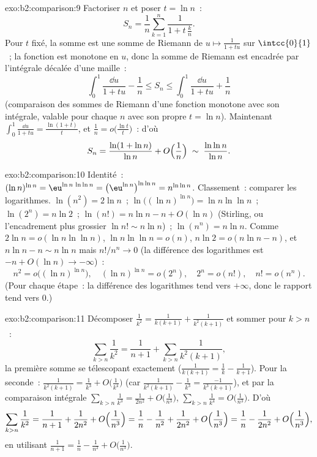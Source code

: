\begin{solution}{exo:b2:comparison:9}
Factoriser $n$ et poser $t = \ln n$~:
\[
S_n = \frac1n \sum_{k=1}^{n} \frac{1}{1 + t\,\frac kn} .
\]
Pour $t$ fixé, la somme est une somme de Riemann de $u \mapsto \frac{1}{1 +
tu}$ sur $\intcc{0}{1}$~; la fonction est monotone en $u$, donc la
somme de Riemann est encadrée par l'intégrale décalée d'une maille~:
\[
\int_0^1 \frac{\dd u}{1 + tu} - \frac1n
\leq S_n \leq \int_0^1 \frac{\dd u}{1 + tu} + \frac1n
\]
(comparaison des sommes de Riemann d'une fonction monotone avec son
intégrale, valable pour chaque $n$ avec son propre $t = \ln n$).
Maintenant $\int_0^1 \frac{\dd u}{1 + tu} = \frac{\ln(1 + t)}{t}$, et
$\frac1n = o\bigl(\frac{\ln t}{t}\bigr)$~: d'où
\[
S_n = \frac{\ln(1 + \ln n)}{\ln n} + O\Bigl(\frac 1n\Bigr)
\;\sim\; \frac{\ln\ln n}{\ln n} .
\]
\end{solution}

\begin{solution}{exo:b2:comparison:10}
Identité~: $(\ln n)^{\ln n} = \eu^{\ln n\,\ln\ln n} =
\bigl(\eu^{\ln n}\bigr)^{\ln\ln n} = n^{\ln\ln n}$. Classement~:
comparer les logarithmes. $\ln(n^2) = 2\ln n$~; $\ln\bigl((\ln
n)^{\ln n}\bigr) = \ln n\ln\ln n$~; $\ln(2^n) = n\ln2$~;
$\ln(n!) = n\ln n - n + O(\ln n)$ (Stirling, ou l'encadrement plus
grossier $\ln n! \sim n\ln n$)~; $\ln(n^n) = n\ln n$. Comme
$2\ln n = o(\ln n\ln\ln n)$, $\ln n\ln\ln n = o(n)$, $n\ln 2 =
o(n\ln n - n)$, et $n \ln n - n \sim n\ln n$ mais $n! / n^n \to
0$ (la différence des logarithmes est $-n + O(\ln n) \to -\infty$)~:
\[
n^2 = o\bigl((\ln n)^{\ln n}\bigr),\quad
(\ln n)^{\ln n} = o(2^n),\quad
2^n = o(n!),\quad
n! = o(n^n).
\]
(Pour chaque étape~: la différence des logarithmes tend vers
$+\infty$, donc le rapport tend vers $0$.)
\end{solution}

\begin{solution}{exo:b2:comparison:11}
Décomposer $\frac1{k^2} = \frac1{k(k+1)} + \frac1{k^2(k+1)}$ et
sommer pour $k > n$~:
\[
\sum_{k>n}\frac1{k^2} = \frac1{n+1} +
\sum_{k>n}\frac{1}{k^2(k+1)} ,
\]
la première somme se télescopant exactement ($\frac1{k(k+1)} = \frac1k -
\frac1{k+1}$). Pour la seconde~: $\frac{1}{k^2(k+1)} = \frac1{k^3}
+ O\bigl(\frac1{k^4}\bigr)$ (car $\frac{1}{k^2(k+1)} -
\frac1{k^3} = \frac{-1}{k^3(k+1)}$), et par la
comparaison intégrale $\sum_{k>n}\frac1{k^3} = \frac1{2n^2} +
O\bigl(\frac1{n^3}\bigr)$, $\sum_{k>n}\frac1{k^4} =
O\bigl(\frac1{n^3}\bigr)$. D'où
\[
\sum_{k>n}\frac1{k^2}
= \frac1{n+1} + \frac{1}{2n^2} + O\Bigl(\frac1{n^3}\Bigr)
= \frac1n - \frac1{n^2} + \frac{1}{2n^2} +
O\Bigl(\frac1{n^3}\Bigr)
= \frac1n - \frac{1}{2n^2} + O\Bigl(\frac1{n^3}\Bigr),
\]
en utilisant $\frac1{n+1} = \frac1n - \frac1{n^2} +
O\bigl(\frac1{n^3}\bigr)$.
\end{solution}

